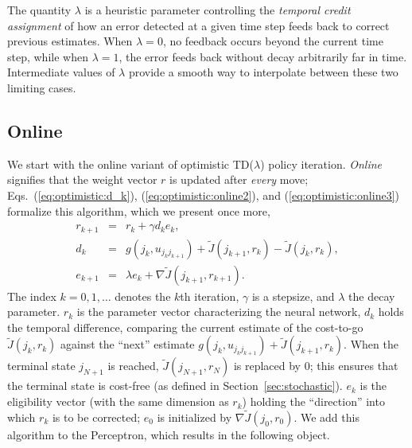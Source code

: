 The quantity $\lambda$ is a heuristic parameter controlling the \emph{temporal credit assignment} of how an error detected at a given time step feeds back to correct previous estimates. When $\lambda=0$, no feedback occurs beyond the current time step, while when $\lambda=1$, the error feeds back without decay arbitrarily far in time. Intermediate values of $\lambda$ provide a smooth way to interpolate between these two limiting cases.







\subsection{Online}
We start with the online variant of optimistic TD($\lambda$) policy iteration. \emph{Online} signifies that the weight vector $r$ is updated after \emph{every} move; Eqs.~(\ref{eq:optimistic:d_k}), (\ref{eq:optimistic:online2}), and (\ref{eq:optimistic:online3}) formalize this algorithm, which we present once more,
\begin{eqnarray} 
\label{eq:impl:opti:online1}
r_{k+1} &=& r_k + \gamma d_k e_k, \\
\label{eq:impl:opti:online2} d_k & =&  g(j_k,u_{j_kj_{k+1}}) + \tilde J(j_{k+1},r_k) - \tilde J(j_k,r_k), \\
\label{eq:impl:opti:online3} e_{k+1} & =&  \lambda e_{k} + \nabla \tilde J(j_{k+1},r_{k+1}).
\end{eqnarray}
The index $k=0,1,\ldots$ denotes the $k$th iteration, $\gamma$ is a stepsize, and $\lambda$ the decay parameter. $r_k$ is the parameter vector characterizing the neural network, $d_k$ holds the temporal difference, comparing the current estimate of the cost-to-go $\tilde J(j_k,r_k)$ against the ``next'' estimate $g(j_k,u_{j_kj_{k+1}}) + \tilde J(j_{k+1},r_k)$. When the terminal state $j_{N+1}$ is reached, $\tilde J(j_{N+1},r_{N})$ is replaced by 0; this ensures that the terminal state is cost-free (as defined in Section~\ref{sec:stochastic}). $e_k$ is the eligibility vector (with the same dimension as $r_k$) holding the ``direction'' into which $r_k$ is to be corrected; $e_0$ is initialized by $\nabla \tilde J(j_{0},r_{0})$. We add this algorithm to the {\al Perceptron}, which results in the following object.

